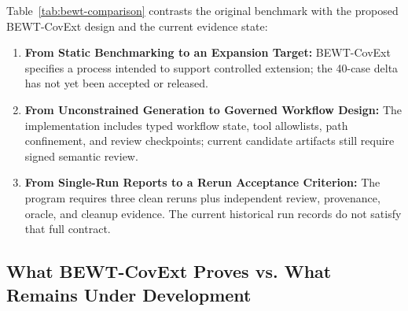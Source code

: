 \documentclass[pdflatex,sn-mathphys-num]{sn-jnl}
\begin{document}
Table~\ref{tab:bewt-comparison} contrasts the original benchmark with the proposed BEWT-CovExt design and the current evidence state:
\begin{enumerate}
    \item \textbf{From Static Benchmarking to an Expansion Target:} BEWT-CovExt specifies a process intended to support controlled extension; the 40-case delta has not yet been accepted or released.
    \item \textbf{From Unconstrained Generation to Governed Workflow Design:} The implementation includes typed workflow state, tool allowlists, path confinement, and review checkpoints; current candidate artifacts still require signed semantic review.
    \item \textbf{From Single-Run Reports to a Rerun Acceptance Criterion:} The program requires three clean reruns plus independent review, provenance, oracle, and cleanup evidence. The current historical run records do not satisfy that full contract.
\end{enumerate}

\subsection{What BEWT-CovExt Proves vs. What Remains Under Development}
\end{document}
